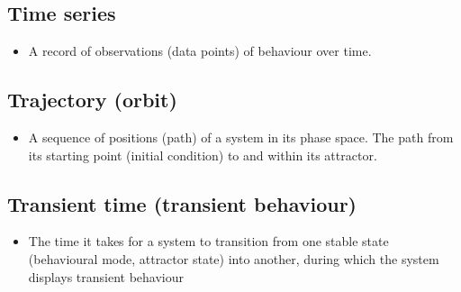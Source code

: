 \documentclass[12pt,]{book}
\providecommand{\tightlist}{%
  \setlength{\itemsep}{0pt}\setlength{\parskip}{0pt}}
\begin{document}
\hypertarget{Time74}{%
\subsection*{\texorpdfstring{\textbf{Time series}}{Time series}}\label{Time74}}

\begin{itemize}
\tightlist
\item
  A record of observations (data points) of behaviour over time.
\end{itemize}

\hypertarget{Traj75}{%
\subsection*{\texorpdfstring{\textbf{Trajectory (orbit)}}{Trajectory (orbit)}}\label{Traj75}}

\begin{itemize}
\tightlist
\item
  A sequence of positions (path) of a system in its phase space. The path from its starting point (initial condition) to and within its attractor.
\end{itemize}

\hypertarget{Tran76}{%
\subsection*{\texorpdfstring{\textbf{Transient time (transient behaviour)}}{Transient time (transient behaviour)}}\label{Tran76}}

\begin{itemize}
\tightlist
\item
  The time it takes for a system to transition from one stable state (behavioural mode, attractor state) into another, during which the system displays transient behaviour
\end{itemize}


\end{document}
